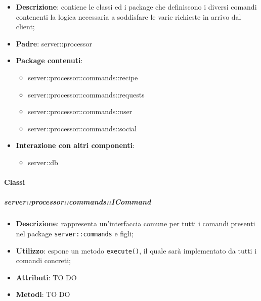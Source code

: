     \begin{itemize}
      \item \textbf{Descrizione}: contiene le classi ed i package che definiscono i diversi comandi contenenti la logica necessaria a soddisfare le varie richieste in arrivo dal client;
      \item \textbf{Padre}: server::processor
      \item \textbf{Package contenuti}:
        \begin{itemize}
          \item server::processor::commands::recipe
          \item server::processor::commands::requests
          \item server::processor::commands::user
          \item server::processor::commands::social
        \end{itemize}
      \item \textbf{Interazione con altri componenti}:
        \begin{itemize}
          \item server::db
        \end{itemize}
    \end{itemize}

      \paragraph{Classi} %

      \subparagraph{server::processor::commands::ICommand} %
      \label{subp:bdsm_app_server_processor_commands_icommand}
      \begin{itemize}
        \item \textbf{Descrizione}: rappresenta un'interfaccia comune per tutti i comandi presenti nel package \texttt{server::commands} e figli;
        \item \textbf{Utilizzo}: espone un metodo \texttt{execute()}, il quale sarà implementato da tutti i comandi concreti;
		\item \textbf{Attributi}: TO DO
		\item \textbf{Metodi}: TO DO
      \end{itemize}


